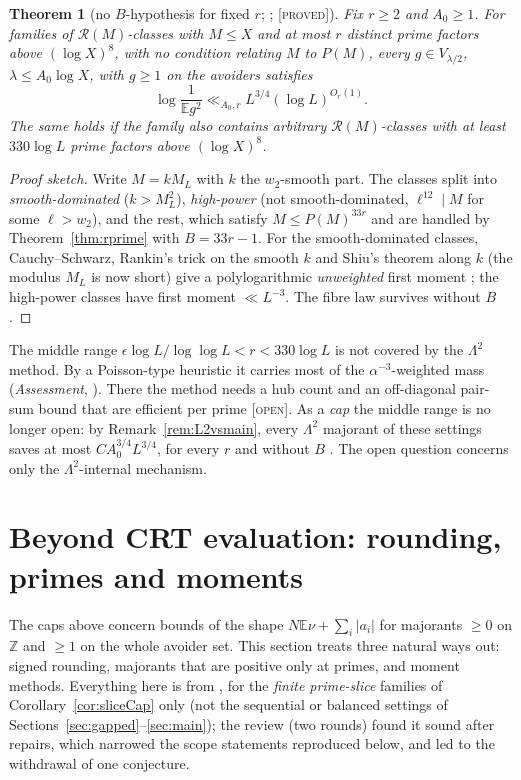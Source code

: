 \documentclass[10pt,reqno]{amsart}
\newtheorem{theorem}{Theorem}[section]
\theoremstyle{definition}
\theoremstyle{remark}
\newcommand{\cR}{\mathscr R}
\newcommand{\E}{\mathbb E}
\newcommand{\Z}{\mathbb Z}
\newcommand{\lab}[1]{\textup{[\textsc{#1}]}}
\begin{document}
\begin{theorem}[no $B$-hypothesis for fixed $r$; {\cite[Thm~10.4]{TW4}}; \lab{proved}]\label{thm:noB}
Fix $r\geq2$ and $A_0\geq1$.  For families of $\cR(M)$-classes with $M\leq X$
and at most $r$ distinct prime factors above $(\log X)^8$, with no
condition relating $M$ to $P(M)$, every $g\in V_{\lambda/2}$,
$\lambda\leq A_0\log X$, with $g\geq1$ on the avoiders satisfies
\[
 \log\frac1{\E g^2}\ll_{A_0,r}L^{3/4}(\log L)^{O_r(1)}.
\]
The same holds if the family also contains arbitrary $\cR(M)$-classes
with at least $330\log L$ prime factors above $(\log X)^8$.
\end{theorem}
\begin{proof}[Proof sketch]
Write $M=kM_L$ with $k$ the $w_2$-smooth part.  The classes split into
\emph{smooth-dominated} ($k>M_L^2$), \emph{high-power} (not
smooth-dominated, $\ell^{12}\mid M$ for some $\ell>w_2$), and the rest,
which satisfy $M\leq P(M)^{33r}$ and are handled by
Theorem~\ref{thm:rprime} with $B=33r-1$.  For the smooth-dominated
classes, Cauchy--Schwarz, Rankin's trick on the smooth $k$ and Shiu's
theorem along $k$ (the modulus $M_L$ is now short) give a
polylogarithmic \emph{unweighted} first moment \cite[Lemmas~10.1,
10.2]{TW4}; the high-power classes have first moment $\ll L^{-3}$.  The
fibre law survives without $B$ \cite[Lemma~10.3]{TW4}.
\end{proof}
The middle range $\epsilon\log L/\log\log L<r<330\log L$ is not covered by the
$\Lambda^2$ method.  By a Poisson-type heuristic it carries most of the
$\alpha^{-3}$-weighted mass (\emph{Assessment}, \cite[\S9.3]{TW4}).  There the
method needs a hub count and an off-diagonal pair-sum bound that are
efficient per prime \cite[\S\S9.3, 12]{TW4} \lab{open}.  As a \emph{cap} the
middle range is no longer open: by Remark~\ref{rem:L2vsmain}, every
$\Lambda^2$ majorant of these settings saves at most $CA_0^{3/4}L^{3/4}$, for every
$r$ and without $B$ \cite[\S\S6--7]{KA3}.  The open question concerns only
the $\Lambda^2$-internal mechanism.

\section{Beyond CRT evaluation: rounding, primes and moments}\label{sec:noncrt}

The caps above concern bounds of the shape $N\E\nu+\sum_i|a_i|$ for
majorants $\geq0$ on $\Z$ and $\geq1$ on the whole avoider set.  This section
treats three natural ways out: signed rounding, majorants that are
positive only at primes, and moment methods.  Everything here is from
\cite{NC}, for the \emph{finite prime-slice} families of
Corollary~\ref{cor:sliceCap} only (not the sequential or balanced
settings of Sections~\ref{sec:gapped}--\ref{sec:main}); the review
\cite{NCrev} (two rounds) found it sound after repairs, which narrowed
the scope statements reproduced below, and led to the withdrawal of one
conjecture.
\end{document}
